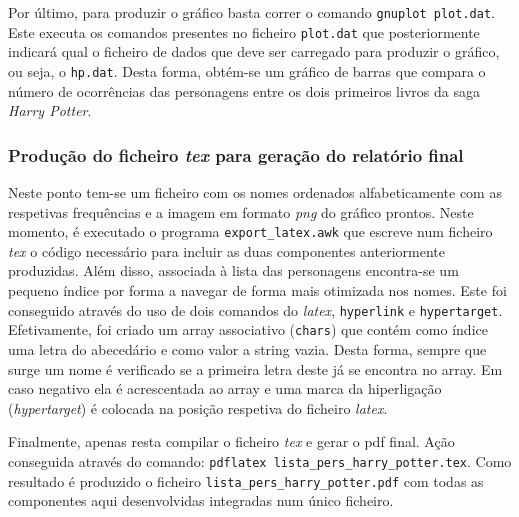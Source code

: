 \documentclass[a4paper]{article}
\begin{document}
Por último, para produzir o gráfico basta correr o comando \texttt{gnuplot plot.dat}. Este executa os comandos presentes no ficheiro \texttt{plot.dat} que posteriormente indicará qual o ficheiro de dados que deve ser carregado para produzir o gráfico, ou seja, o \texttt{hp.dat}. Desta forma, obtém-se um gráfico de barras que compara o número de ocorrências das personagens entre os dois primeiros livros da saga \textit{Harry Potter}.


\subsubsection{Produção do ficheiro \textit{tex} para geração do relatório final}

\hspace{3mm} Neste ponto tem-se um ficheiro com os nomes ordenados alfabeticamente com as respetivas frequências e a imagem em formato \textit{png} do gráfico prontos. Neste momento, é executado o programa \texttt{export\_latex.awk} que escreve num ficheiro \textit{tex} o código necessário para incluir as duas componentes anteriormente produzidas. Além disso, associada à lista das personagens encontra-se um pequeno índice por forma a navegar de forma mais otimizada nos nomes. Este foi conseguido através do uso de dois comandos do \textit{latex}, \texttt{hyperlink} e \texttt{hypertarget}. Efetivamente, foi criado um array associativo (\texttt{chars}) que contém como índice uma letra do abecedário e como valor a string vazia. Desta forma, sempre que surge um nome é verificado se a primeira letra deste já se encontra no array. Em caso negativo ela é acrescentada ao array e uma marca da hiperligação (\textit{hypertarget}) é colocada na posição respetiva do ficheiro \textit{latex}.

Finalmente, apenas resta compilar o ficheiro \textit{tex} e gerar o pdf final. Ação conseguida através do comando: \texttt{pdflatex lista\_pers\_harry\_potter.tex}. Como resultado é produzido o ficheiro \texttt{lista\_pers\_harry\_potter.pdf} com todas as componentes aqui desenvolvidas integradas num único ficheiro.
\end{document}
